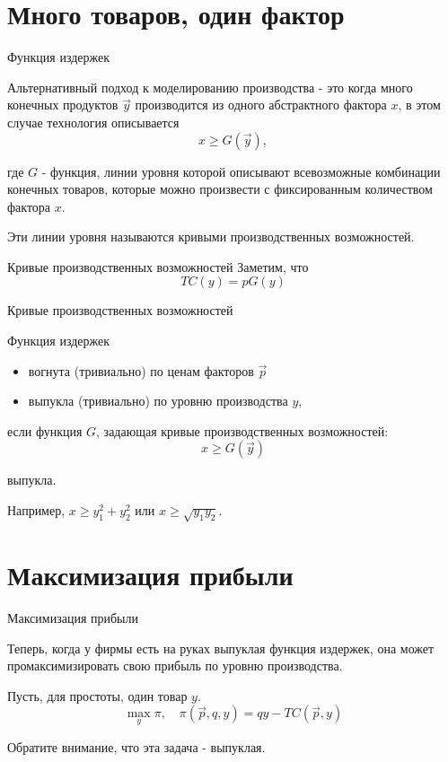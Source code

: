 \documentclass{beamer}
\begin{document}
\section{Много товаров, один фактор}

\begin{frame}{Функция издержек}

Альтернативный подход к моделированию производства - это когда много конечных продуктов $\vec y$ производится из одного абстрактного фактора $x$, в этом случае технология описывается
$$ x \geqslant G(\vec y),$$

где $G$ - функция, линии уровня которой описывают всевозможные комбинации конечных товаров, которые можно произвести с фиксированным количеством фактора $x$. 

Эти линии уровня называются \alert{кривыми производственных возможностей}.
\end{frame}

\begin{frame}{Кривые производственных возможностей}
Заметим, что $$ TC(y) = p G(y)$$
\end{frame}

\begin{frame}{Кривые производственных возможностей}
\begin{lemma}
\alert{Функция издержек}

\begin{itemize}
\item вогнута (тривиально) по ценам факторов $\vec p$
\item выпукла (тривиально) по уровню производства $y$,
\end{itemize}

если функция $G$, задающая кривые производственных возможностей:
$$x \geqslant G(\vec y)$$

выпукла.
\end{lemma}
Например, $x \geqslant y_1^2 + y_2^2$ или $x \geqslant \sqrt{y_1 y_2}$.
\end{frame}

\section{Максимизация прибыли}

\begin{frame}{Максимизация прибыли}

Теперь, когда у фирмы есть на руках выпуклая функция издержек, она может промаксимизировать свою прибыль по уровню производства.

Пусть, для простоты, один товар $y$.
$$ \max_{y} \pi, \quad \pi(\vec p, q, y) = q y - TC(\vec p, y)$$

Обратите внимание, что эта задача - выпуклая.

\end{frame}
\end{document}
